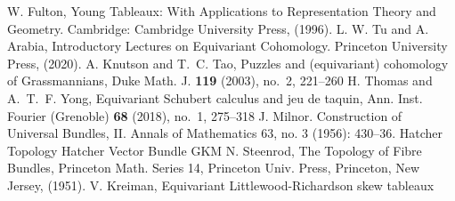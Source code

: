 \begin{thebibliography}{99}
  
   W. Fulton, Young Tableaux: With Applications to Representation Theory and Geometry. Cambridge: Cambridge University Press, (1996).
   L. W. Tu and A. Arabia, Introductory Lectures on Equivariant Cohomology. Princeton University Press, (2020).
   A. Knutson and T.~C. Tao, Puzzles and (equivariant) cohomology of Grassmannians, Duke Math. J. {\bf 119} (2003), no.~2, 221--260 
   H. Thomas and A.~T.~F. Yong, Equivariant Schubert calculus and jeu de taquin, Ann. Inst. Fourier (Grenoble) {\bf 68} (2018), no.~1, 275--318
   J. Milnor. Construction of Universal Bundles, II. Annals of Mathematics 63, no. 3 (1956): 430–36.
   Hatcher Topology
   Hatcher Vector Bundle
   GKM
   N. Steenrod, The Topology of Fibre Bundles, Princeton Math. Series 14,
  Princeton Univ. Press, Princeton, New Jersey, (1951).
   V. Kreiman, Equivariant Littlewood-Richardson skew tableaux

\end{thebibliography}